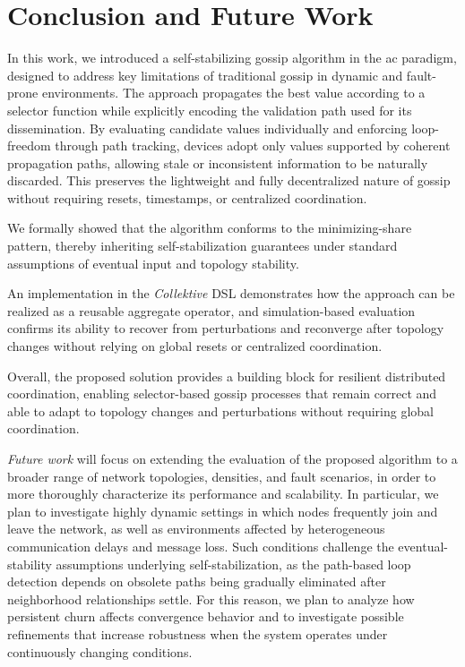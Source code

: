 \documentclass[runningheads]{llncs}
\newcommand{\ck}{\emph{Collektive}}
\begin{document}


\section{Conclusion and Future Work}\label{sec:conclusion-and-future-work}


In this work,
we introduced a self-stabilizing gossip algorithm in the \ac{ac} paradigm,
designed to address key limitations of traditional gossip in dynamic and fault-prone environments.
%
The approach propagates the best value according to a selector function while explicitly encoding the validation path used for its dissemination.
%
By evaluating candidate values individually and enforcing loop-freedom through path tracking,
devices adopt only values supported by coherent propagation paths,
allowing stale or inconsistent information to be naturally discarded.
%
This preserves the lightweight and fully decentralized nature of gossip without requiring resets, timestamps, or centralized coordination.

We formally showed that the algorithm conforms to the minimizing-share pattern,
thereby inheriting self-stabilization guarantees under standard assumptions of eventual input and topology stability.

An implementation in the \ck{} DSL demonstrates how the approach can be realized as a reusable aggregate operator,
and simulation-based evaluation confirms its ability to recover from perturbations and reconverge after topology changes
without relying on global resets or centralized coordination.

Overall,
the proposed solution provides a building block for resilient distributed coordination,
enabling selector-based gossip processes that remain correct and able to adapt to topology changes and perturbations without requiring global coordination.

\emph{Future work} will focus on extending the evaluation of the proposed algorithm to a broader range of network topologies,
densities,
and fault scenarios, in order to more thoroughly characterize its performance and scalability.
%
In particular,
we plan to investigate highly dynamic settings in which nodes frequently join and leave the network,
as well as environments affected by heterogeneous communication delays and message loss.
%
Such conditions challenge the eventual-stability assumptions underlying self-stabilization,
as the path-based loop detection depends on obsolete paths being gradually eliminated after neighborhood relationships settle.
%
For this reason,
we plan to analyze how persistent churn affects convergence behavior and to investigate possible refinements that increase
robustness when the system operates under continuously changing conditions.
\end{document}
